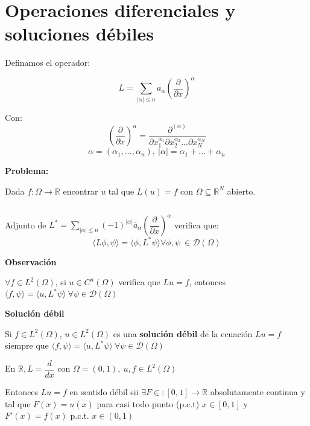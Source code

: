 \documentclass[openany]{book}
\begin{document}
\section{Operaciones diferenciales y soluciones débiles }

Definamos el operador:

$$ L = \sum\limits_{|\alpha|\leq n}^{} a_{\alpha} \left( \dfrac{\partial }{\partial x} \right)^{\alpha} $$

Con:
$$ \left( \dfrac{\partial }{\partial x} \right)^{\alpha} = \dfrac{\partial ^{(\alpha)}}{\partial x_1^{\alpha_1}\partial x_2^{\alpha_2}...\partial x_N^{\alpha_N}} $$
$$ \alpha = (\alpha_1,...,\alpha_n),\ |\alpha| = \alpha_1+...+\alpha_n $$

\textbf{Problema:}

Dada $ f:\Omega \to\mathbb{R}$  encontrar $ u$ tal que $ L(u) = f$ con $ \Omega \subseteq \mathbb{R}^{N}$ abierto.

\begin{proposition}
    $ $

    Adjunto de $ L^{*} = \sum\limits_{|\alpha|\leq n}^{}(-1)^{|\alpha|} \overline{a}_{\alpha} \left( \dfrac{\partial }{\partial x} \right)^{\alpha}$ verifica que:
    $$ \langle L \phi, \psi \rangle = \langle \phi, L^{*}\psi \rangle \forall \phi,\psi\  \in \mathcal{D}(\Omega ) $$

\end{proposition}

\begin{flushright}
    \textbf{Observación}
\end{flushright}
$\forall f \in L^2(\Omega )$, si $ u \in C^{n}(\Omega )$ verifica que $ L u = f$, entonces $ \langle f, \psi \rangle = \langle u, L^{*}\psi \rangle\ \forall \psi \in \mathcal{D}(\Omega )$

\begin{definition}
    \textbf{Solución débil}

    Si $ f \in L^2(\Omega )$, $ u \in L^2(\Omega )$ es una \textbf{solución débil} de la ecuación $ L u = f$ siempre que $ \langle f, \psi \rangle = \langle u, L^{*}\psi \rangle\ \forall \psi \in \mathcal{D}(\Omega )$
\end{definition}


\begin{example}
    En $ \mathbb{R}, L = \dfrac{d}{dx}$ con $ \Omega  = (0,1),\ u,f \in L^2(\Omega )$

    Entonces $ Lu = f$ en sentido débil sii $ \exists F \in :[0,1] \to \mathbb{R}$ absolutamente continua y tal que $ F(x) = u(x)$ para casi todo punto (p.c.t) $ x \in [0,1]$ y $ F'(x) = f(x)$ p.c.t. $ x \in (0,1)$
\end{example}
\end{document}
